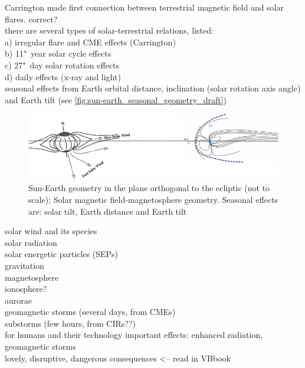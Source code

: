 Carrington made first connection between terrestrial magnetic field and solar flares. correct?\\

there are several types of solar-terrestrial relations, \citet{Bartels1962} listed:\\	%
a) irregular flare and CME effects (Carrington)\\
b) 11"~year solar cycle effects\\
c) 27"~day solar rotation effects\\
d) daily effects (x-ray and light)\\

seasonal effects from Earth orbital distance, inclination (solar rotation axis angle) and Earth tilt (see \autoref{fig:sun-earth_seasonal_geometry_draft})\\
\begin{figure}[htb]
	\centering
	\includegraphics[width=\textwidth]{images/own_figures/sun-earth_seasonal_geometry_draft.png}
	\caption{Sun-Earth geometry in the plane orthogonal to the ecliptic (not to scale); Solar magnetic field-magnetosphere geometry. Seasonal effects are: solar tilt, Earth distance and Earth tilt}
	\label{fig:sun-earth_seasonal_geometry_draft}
\end{figure}

solar wind and its species\\
solar radiation\\
solar energetic particles (SEPs)\\
gravitation\\

magnetosphere\\
ionosphere?\\
aurorae\\
geomagnetic storms (several days, from CMEs)\\
substorms (few hours, from CIRs??)\\

for humans and their technology important effects: enhanced radiation, geomagnetic storms\\
lovely, disruptive, dangerous consequences <-- read in VBbook\\

